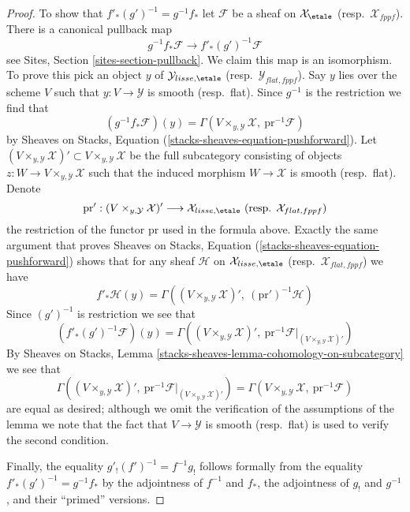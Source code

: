 \begin{proof}
\medskip\noindent
To show that $f'_*(g')^{-1} = g^{-1}f_*$ let $\mathcal{F}$ be a sheaf
on $\mathcal{X}_\etale$ (resp.\ $\mathcal{X}_{fppf}$).
There is a canonical pullback map
$$
g^{-1}f_*\mathcal{F} \longrightarrow f'_*(g')^{-1}\mathcal{F}
$$
see Sites, Section \ref{sites-section-pullback}.
We claim this map is an isomorphism.
To prove this pick an object $y$ of $\mathcal{Y}_{lisse,\etale}$
(resp.\ $\mathcal{Y}_{flat,fppf}$). Say $y$ lies over the scheme $V$
such that $y : V \to \mathcal{Y}$ is smooth (resp.\ flat). Since
$g^{-1}$ is the restriction we find that
$$
\left(g^{-1}f_*\mathcal{F}\right)(y) =
\Gamma(V \times_{y, \mathcal{Y}} \mathcal{X},\ \text{pr}^{-1}\mathcal{F})
$$
by Sheaves on Stacks, Equation (\ref{stacks-sheaves-equation-pushforward}).
Let
$(V \times_{y, \mathcal{Y}} \mathcal{X})' \subset
V \times_{y, \mathcal{Y}} \mathcal{X}$
be the full subcategory consisting of objects
$z : W \to V \times_{y, \mathcal{Y}} \mathcal{X}$ such that the induced
morphism $W \to \mathcal{X}$ is smooth (resp.\ flat). Denote
$$
\text{pr}' :
(V \times_{y, \mathcal{Y}} \mathcal{X})'
\longrightarrow
\mathcal{X}_{lisse,\etale}
\ (\text{resp. }\mathcal{X}_{flat,fppf})
$$
the restriction of the functor $\text{pr}$ used in the formula above.
Exactly the same argument that proves
Sheaves on Stacks, Equation (\ref{stacks-sheaves-equation-pushforward})
shows that for any sheaf $\mathcal{H}$ on $\mathcal{X}_{lisse,\etale}$
(resp.\ $\mathcal{X}_{flat,fppf}$) we have
\begin{equation}
\label{equation-pushforward-lisse-etale}
f'_*\mathcal{H}(y) =
\Gamma((V \times_{y, \mathcal{Y}} \mathcal{X})',
\ (\text{pr}')^{-1}\mathcal{H})
\end{equation}
Since $(g')^{-1}$ is restriction we see that
$$
\left(f'_*(g')^{-1}\mathcal{F}\right)(y) =
\Gamma((V \times_{y, \mathcal{Y}} \mathcal{X})',
\ \text{pr}^{-1}\mathcal{F}|_{(V \times_{y, \mathcal{Y}} \mathcal{X})'})
$$
By
Sheaves on Stacks, Lemma \ref{stacks-sheaves-lemma-cohomology-on-subcategory}
we see that
$$
\Gamma((V \times_{y, \mathcal{Y}} \mathcal{X})',
\ \text{pr}^{-1}\mathcal{F}|_{(V \times_{y, \mathcal{Y}} \mathcal{X})'})
=
\Gamma(V \times_{y, \mathcal{Y}} \mathcal{X},\ \text{pr}^{-1}\mathcal{F})
$$
are equal as desired; although we omit the verification of the assumptions
of the lemma we note that the fact that $V \to \mathcal{Y}$ is smooth
(resp.\ flat) is used to verify the second condition.

\medskip\noindent
Finally, the equality $g'_!(f')^{-1} = f^{-1}g_!$ follows formally from
the equality $f'_*(g')^{-1} = g^{-1}f_*$ by the adjointness of
$f^{-1}$ and $f_*$, the adjointness of $g_!$ and $g^{-1}$, and their
``primed'' versions.
\end{proof}

